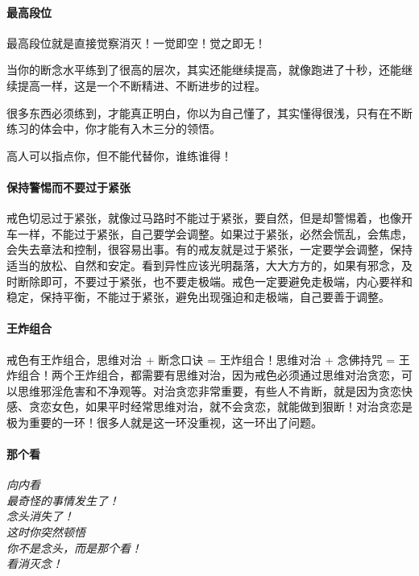 \paragraph{最高段位}

最高段位就是直接觉察消灭！一觉即空！觉之即无！

当你的断念水平练到了很高的层次，其实还能继续提高，就像跑进了十秒，还能继续提高一样，这是一个不断精进、不断进步的过程。

很多东西必须练到，才能真正明白，你以为自己懂了，其实懂得很浅，只有在不断练习的体会中，你才能有入木三分的领悟。

高人可以指点你，但不能代替你，谁练谁得！

\paragraph{保持警惕而不要过于紧张}

戒色切忌过于紧张，就像过马路时不能过于紧张，要自然，但是却警惕着，也像开车一样，不能过于紧张，自己要学会调整。如果过于紧张，必然会慌乱，会焦虑，会失去章法和控制，很容易出事。有的戒友就是过于紧张，一定要学会调整，保持适当的放松、自然和安定。看到异性应该光明磊落，大大方方的，如果有邪念，及时断除即可，不要过于紧张，也不要走极端。戒色一定要避免走极端，内心要祥和稳定，保持平衡，不能过于紧张，避免出现强迫和走极端，自己要善于调整。

\paragraph{王炸组合}

戒色有王炸组合，思维对治 + 断念口诀 = 王炸组合！思维对治 + 念佛持咒 = 王炸组合！两个王炸组合，都需要有思维对治，因为戒色必须通过思维对治贪恋，可以思维邪淫危害和不净观等。对治贪恋非常重要，有些人不肯断，就是因为贪恋快感、贪恋女色，如果平时经常思维对治，就不会贪恋，就能做到狠断！对治贪恋是极为重要的一环！很多人就是这一环没重视，这一环出了问题。

\paragraph{那个看}

\begin{center}\it
    向内看 \\ 最奇怪的事情发生了！ \\ 念头消失了！ \\ 这时你突然顿悟 \\ 你不是念头，而是那个看！ \\ 看消灭念！
\end{center}

